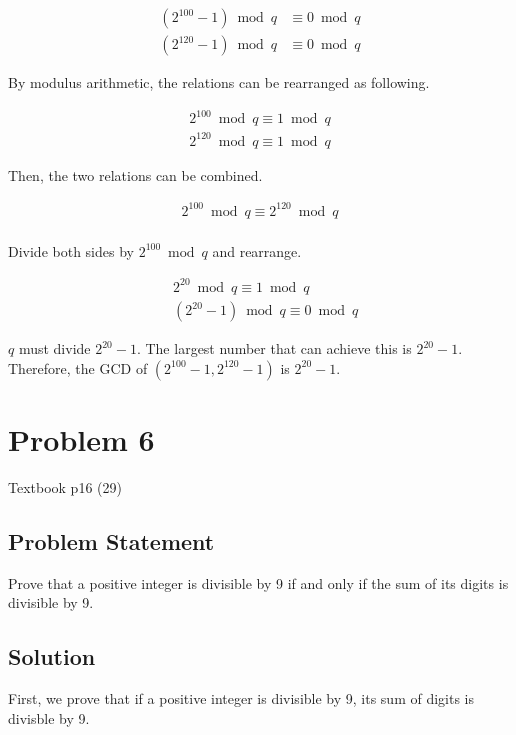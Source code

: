 \documentclass{article}
\begin{document}
\begin{align*}
	(2^{100} - 1) \bmod q & \equiv 0 \bmod q \\
	(2^{120} - 1) \bmod q & \equiv 0 \bmod q
\end{align*}

By modulus arithmetic, the relations can be rearranged as following.

\begin{align*}
	2^{100} \bmod q \equiv 1 \bmod q \\
	2^{120} \bmod q \equiv 1 \bmod q
\end{align*}

Then, the two relations can be combined.

\begin{align*}
	2^{100} \bmod q \equiv 2^{120} \bmod q \\
\end{align*}

Divide both sides by $2^{100} \bmod q$ and rearrange.

\begin{align*}
	 & 2^{20} \bmod q \equiv 1 \bmod q       \\
	 & (2^{20} - 1) \bmod q \equiv 0 \bmod q
\end{align*}

$q$ must divide $2^{20} - 1$. The largest number that can achieve this is $2^{20} -1$. Therefore, the GCD of $(2^{100} - 1, 2^{120} - 1)$ is $2^{20} -1$.

\section*{Problem 6}

Textbook p16 (29)

\subsection*{Problem Statement}

Prove that a positive integer is divisible by 9 if and only if the sum of its digits is divisible by 9.

\subsection*{Solution}

First, we prove that if a positive integer is divisible by 9, its sum of digits is divisble by 9.
\end{document}
